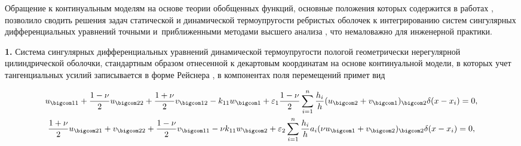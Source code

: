 Обращение к  континуальным моделям на основе теории обобщенных функций, основные положения которых содержится в работах \cite{myl-bib:9, myl-bib:10, myl-bib:11, myl-bib:12, myl-bib:15,myl-bib:16,myl-bib:18}, позволило сводить решения задач статической и динамической термоупругости ребристых  оболочек к интегрированию систем сингулярных дифференциальных уравнений точными и~приближенными методами высшего анализа \cite{myl-bib:19, myl-bib:21}, что немаловажно для инженерной практики.



\smallskip



{\bf 1.} Система сингулярных дифференциальных уравнений динамической термоупругости пологой геометрически нерегулярной цилиндрической оболочки, стандартным образом отнесенной к декартовым координатам на основе континуальной модели, в которых учет тангенциальных усилий записывается в форме Рейснера \cite{myl-bib:22a}, в компонентах поля перемещений примет вид

\begin{gather}

u_{\bigcom 11}+\frac{1-\nu}{2}u_{\bigcom 22}+\frac{1+\nu}{2} v_{\bigcom 12}-k_{11}w_{\bigcom 1}+

\varepsilon_1\frac{1-\nu}{2} \sum_{i=1}^n \frac{h_i}{h}(u_{\bigcom 2}+v_{\bigcom 1} )_{\bigcom 2}\delta(x-x_i)=0,

\\

\frac{1+\nu}{2}u_{\bigcom 21}+ v_{\bigcom 22}+\frac{1-\nu}{2}v_{\bigcom 11}-\nu k_{11}w_{\bigcom 2}+\varepsilon_2\sum_{i=1}^n\frac{h_i}{h}a_i ( \nu u_{\bigcom 1}+v_{\bigcom 2})_{\bigcom 2} \delta(x-x_i)=0,

\end{gather}



\vspace{-12mm}




